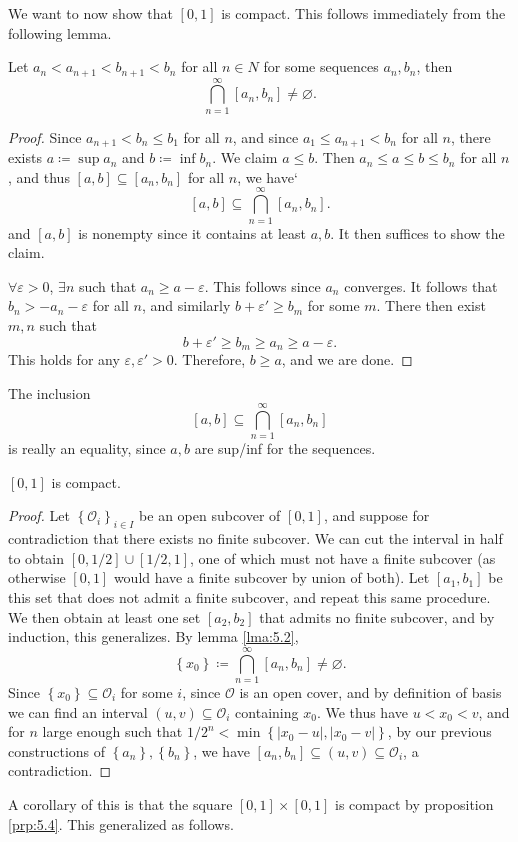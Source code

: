 We want to now show that $[0,1]$ is compact. This follows immediately from the following lemma.
\begin{lemma}\label{lma:5.2}
	Let $a_n<a_{n+1} <b_{n+1} <b_n$ for all $n\in N$ for some sequences $a_n,b_n$, then
	\[
		\bigcap_{n=1}^{\infty } [a_n,b_n]\neq \varnothing 
	.\]
\end{lemma}
\begin{proof}
	Since $a_{n+1} <b_n\leq b_1$ for all $n$, and since $a_1\leq a_{n+1} <b_n$ for all $n$, there exists $a\coloneqq \sup a_n$ and $b\coloneqq \inf b_n$. We claim $a\leq b$. Then $a_n\leq a\leq b\leq b_n$ for all $n$, and thus $[a,b]\subseteq [a_n,b_n]$ for all $n$, we have`
	\[
		[a,b]\subseteq \bigcap_{n=1}^{\infty } [a_n,b_n]
	.\]
	and $[a,b]$ is nonempty since it contains at least $a,b$. It then suffices to show the claim.

	$\forall \varepsilon >0$, $\exists n$ such that $a_n\geq a-\varepsilon $. This follows since $a_n$ converges. It follows that $b_n>-a_n-\varepsilon $ for all $n$, and similarly $b+\varepsilon '\geq b_m$ for some $m$. There then exist $m,n$ such that
	\[
		b+\varepsilon '\geq b_m\geq a_n\geq a-\varepsilon 
	.\]
	This holds for any $\varepsilon ,\varepsilon '>0$. Therefore, $b\geq a$, and we are done.
\end{proof}
	The inclusion
	\[
		[a,b]\subseteq \bigcap_{n=1}^{\infty } [a_n,b_n]
	\]
	is really an equality, since $a,b$ are sup/inf for the sequences.
\begin{proposition}\label{prp:5.5}
	$[0,1]$ is compact.
\end{proposition}
\begin{proof}
	Let $\left\{ \mathcal{O}_i \right\}_{i\in I} $ be an open subcover of $[0,1]$, and suppose for contradiction that there exists no finite subcover. We can cut the interval in half to obtain $[0,1/2]\cup [1/2,1]$, one of which must not have a finite subcover (as otherwise $[0,1]$ would have a finite subcover by union of both). Let $[a_1,b_1]$ be this set that does not admit a finite subcover, and repeat this same procedure. We then obtain at least one set $[a_2,b_2]$ that admits no finite subcover, and by induction, this generalizes. By lemma \ref{lma:5.2}, 
	\[
		\left\{ x_0 \right\} \coloneqq \bigcap_{n=1}^{\infty } [a_n,b_n]\neq \varnothing 
	.\]
	Since $\left\{ x_0 \right\} \subseteq \mathcal{O}_i$ for some $i$, since $\mathcal{O} $ is an open cover, and by definition of basis we can find an interval $(u,v)\subseteq \mathcal{O} _i$ containing $x_0$. We thus have $u<x_0<v$, and for $n$ large enough such that $1/2^n < \min \left\{ |x_0-u| ,|x_0 - v| \right\} $, by our previous constructions of $\left\{ a_n \right\} ,\left\{ b_n \right\} $, we have $[a_n,b_n]\subseteq (u,v)\subseteq \mathcal{O} _i$, a contradiction.
\end{proof}
A corollary of this is that the square $[0,1]\times [0,1]$ is compact by proposition \ref{prp:5.4}. This generalized as follows.

